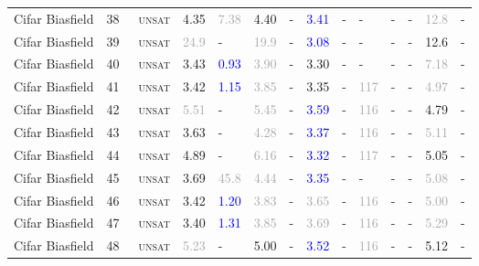 \begin{center}
{\begin{longtable}{@{}llllllllllllll@{}}
Cifar Biasfield & 38 & ~\textsc{unsat} & \textcolor{second}{4.35} & \textcolor{darkgray}{7.38} & \textcolor{second}{4.40} & - & \textcolor{blue}{3.41} & - & - & - & - & \textcolor{darkgray}{12.8} & - \\
Cifar Biasfield & 39 & ~\textsc{unsat} & \textcolor{darkgray}{24.9} & - & \textcolor{darkgray}{19.9} & - & \textcolor{blue}{3.08} & - & - & - & - & \textcolor{second}{12.6} & - \\
Cifar Biasfield & 40 & ~\textsc{unsat} & \textcolor{second}{3.43} & \textcolor{blue}{0.93} & \textcolor{darkgray}{3.90} & - & \textcolor{second}{3.30} & - & - & - & - & \textcolor{darkgray}{7.18} & - \\
Cifar Biasfield & 41 & ~\textsc{unsat} & \textcolor{second}{3.42} & \textcolor{blue}{1.15} & \textcolor{darkgray}{3.85} & - & \textcolor{second}{3.35} & - & \textcolor{darkgray}{117} & - & - & \textcolor{darkgray}{4.97} & - \\
Cifar Biasfield & 42 & ~\textsc{unsat} & \textcolor{darkgray}{5.51} & - & \textcolor{darkgray}{5.45} & - & \textcolor{blue}{3.59} & - & \textcolor{darkgray}{116} & - & - & \textcolor{second}{4.79} & - \\
Cifar Biasfield & 43 & ~\textsc{unsat} & \textcolor{second}{3.63} & - & \textcolor{darkgray}{4.28} & - & \textcolor{blue}{3.37} & - & \textcolor{darkgray}{116} & - & - & \textcolor{darkgray}{5.11} & - \\
Cifar Biasfield & 44 & ~\textsc{unsat} & \textcolor{second}{4.89} & - & \textcolor{darkgray}{6.16} & - & \textcolor{blue}{3.32} & - & \textcolor{darkgray}{117} & - & - & \textcolor{second}{5.05} & - \\
Cifar Biasfield & 45 & ~\textsc{unsat} & \textcolor{second}{3.69} & \textcolor{darkgray}{45.8} & \textcolor{darkgray}{4.44} & - & \textcolor{blue}{3.35} & - & - & - & - & \textcolor{darkgray}{5.08} & - \\
Cifar Biasfield & 46 & ~\textsc{unsat} & \textcolor{second}{3.42} & \textcolor{blue}{1.20} & \textcolor{darkgray}{3.83} & - & \textcolor{darkgray}{3.65} & - & \textcolor{darkgray}{116} & - & - & \textcolor{darkgray}{5.00} & - \\
Cifar Biasfield & 47 & ~\textsc{unsat} & \textcolor{second}{3.40} & \textcolor{blue}{1.31} & \textcolor{darkgray}{3.85} & - & \textcolor{darkgray}{3.69} & - & \textcolor{darkgray}{116} & - & - & \textcolor{darkgray}{5.29} & - \\
Cifar Biasfield & 48 & ~\textsc{unsat} & \textcolor{darkgray}{5.23} & - & \textcolor{second}{5.00} & - & \textcolor{blue}{3.52} & - & \textcolor{darkgray}{116} & - & - & \textcolor{second}{5.12} & - \\

\end{longtable}}
\end{center}
